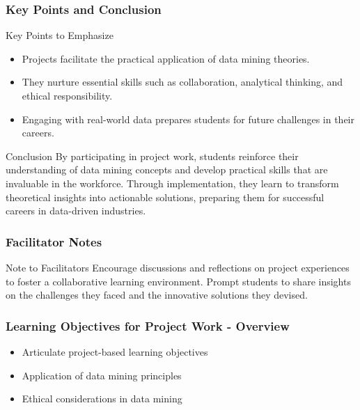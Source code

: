 \documentclass[aspectratio=169]{beamer}
\begin{document}
\begin{frame}[fragile]
    \frametitle{Key Points and Conclusion}
    \begin{block}{Key Points to Emphasize}
        \begin{itemize}
            \item Projects facilitate the practical application of data mining theories.
            \item They nurture essential skills such as collaboration, analytical thinking, and ethical responsibility.
            \item Engaging with real-world data prepares students for future challenges in their careers.
        \end{itemize}
    \end{block}
    
    \begin{block}{Conclusion}
        By participating in project work, students reinforce their understanding of data mining concepts and develop practical skills that are invaluable in the workforce. Through implementation, they learn to transform theoretical insights into actionable solutions, preparing them for successful careers in data-driven industries.
    \end{block}
\end{frame}

\begin{frame}[fragile]
    \frametitle{Facilitator Notes}
    \begin{block}{Note to Facilitators}
        Encourage discussions and reflections on project experiences to foster a collaborative learning environment. Prompt students to share insights on the challenges they faced and the innovative solutions they devised.
    \end{block}
\end{frame}

\begin{frame}[fragile]
    \frametitle{Learning Objectives for Project Work - Overview}
    \begin{itemize}
        \item Articulate project-based learning objectives
        \item Application of data mining principles
        \item Ethical considerations in data mining
    \end{itemize}
\end{frame}
\end{document}
